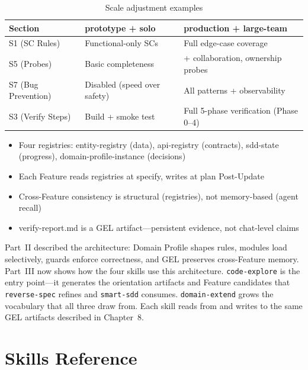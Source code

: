 \documentclass[11pt,a4paper,openright,twoside]{report}
\begin{document}
\begin{table}[H]
\centering
\caption{Scale adjustment examples}
\label{tab:scale-adjust}
\begin{tabularx}{\textwidth}{lXX}
\toprule
\textbf{Section} & \textbf{prototype + solo} & \textbf{production + large-team} \\
\midrule
S1 (SC Rules) & Functional-only SCs & Full edge-case coverage \\
S5 (Probes) & Basic completeness & + collaboration, ownership probes \\
S7 (Bug Prevention) & Disabled (speed over safety) & All patterns + observability \\
S3 (Verify Steps) & Build + smoke test & Full 5-phase verification (Phase 0--4) \\
\bottomrule
\end{tabularx}
\end{table}

\begin{tipbox}
\begin{itemize}[nosep]
  \item Four registries: entity-registry (data), api-registry (contracts), sdd-state (progress), domain-profile-instance (decisions)
  \item Each Feature reads registries at specify, writes at plan Post-Update
  \item Cross-Feature consistency is structural (registries), not memory-based (agent recall)
  \item verify-report.md is a GEL artifact---persistent evidence, not chat-level claims
\end{itemize}
\end{tipbox}

Part~II described the architecture: Domain Profile shapes rules, modules load selectively, guards enforce correctness, and GEL preserves cross-Feature memory. Part~III now shows how the four skills use this architecture. \texttt{code-explore} is the entry point---it generates the orientation artifacts and Feature candidates that \texttt{reverse-spec} refines and \texttt{smart-sdd} consumes. \texttt{domain-extend} grows the vocabulary that all three draw from. Each skill reads from and writes to the same GEL artifacts described in Chapter~8.

\part{Skills Reference}
\end{document}
